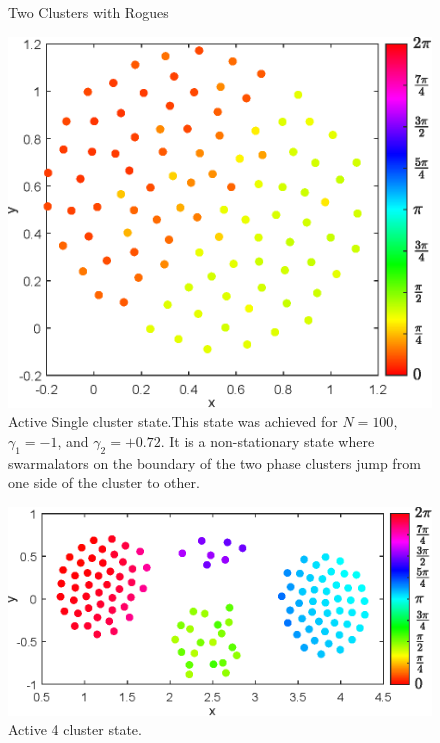 \documentclass[twocolumn,10pt]{asme2ej}
\begin{document}
{\begin{figure}[h!]
        \caption{Two Clusters with Rogues}
        \label{fig:twoClustersWithRogues}
    \end{figure}
    \begin{figure}[h!]
        \includegraphics[width = \linewidth]{ActiveSingle.eps}
        \caption{Active Single cluster state.This state was achieved for \(N = 100\), \(\gamma_1 = -1\), and \(\gamma_2 = +0.72\). It is a non-stationary state where swarmalators on the boundary of the two phase clusters jump from one side of the cluster to other.}
        \label{fig:ActiveSingle}
    \end{figure}
    \begin{figure}
        \includegraphics[width = \linewidth]{Active4Clust.eps}
        \caption{Active 4 cluster state.}
        \label{fig:Active4Clust}
    \end{figure}
}
\end{document}
